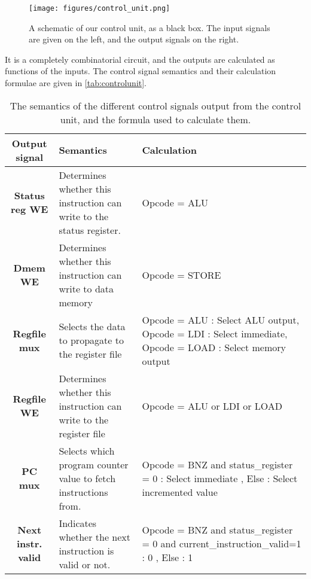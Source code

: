 \documentclass[11pt]{article}
\begin{document}
\begin{figure}[ht]
  \centering
  \texttt{[image: figures/control\_unit.png]}
  \caption{\label{fig:controlunit} A schematic of our control unit, as a black box. The input signals are given on the left, and the output signals on the right.}
\end{figure}

It is a completely combinatorial circuit, and the outputs are
calculated as functions of the inputs. The control signal semantics
and their calculation formulae are given in \autoref{tab:controlunit}.

\begin{table}[htbp]
  \centering
  \begin{tabular}{|c|p{150pt}|p{150pt}|}
    \hline
    {\bf Output signal} & {\bf Semantics} & {\bf Calculation} \\ \hline
    {\bf Status reg WE} & Determines whether this instruction can write to the status register. & Opcode = ALU \\ \hline
    {\bf Dmem WE} & Determines whether this instruction can write to data memory & Opcode = STORE \\ \hline
    {\bf Regfile mux} & Selects the data to propagate to the register file & Opcode = ALU : Select ALU output, 
                                                                             Opcode = LDI : Select immediate, 
                                                                             Opcode = LOAD : Select memory output\\ \hline
    {\bf Regfile WE} & Determines whether this instruction can write to the register file & Opcode = ALU or LDI or LOAD \\ \hline
    {\bf PC mux} & Selects which program counter value to fetch instructions from. & Opcode = BNZ and status\_register = 0 : Select immediate , 
                                                                                                                    Else  : Select incremented value\\ \hline
    {\bf Next instr. valid} & Indicates whether the next instruction is valid or not. & Opcode = BNZ and status\_register = 0 and current\_instruction\_valid=1 : 0 ,
                                                                                                                                                        Else : 1\\ \hline
  \end{tabular}
  \caption{The semantics of the different control signals output from the control unit, and the formula used to calculate them.}
  \label{tab:controlunit}
\end{table}
\end{document}
